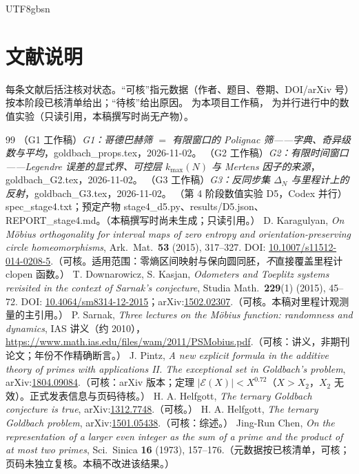 \documentclass[11pt,a4paper]{article}
\newcommand{\Exc}{\mathcal E}          %
\theoremstyle{plain}
\theoremstyle{definition}
\begin{document}
\begin{CJK}{UTF8}{gbsn}
\section*{文献说明}
每条文献后括注核对状态。“可核”指元数据（作者、题目、卷期、DOI/arXiv 号）按本阶段已核清单给出；“待核”给出原因。
\cite{G1,G2,G3} 为本项目工作稿，\cite{D5} 为并行进行中的数值实验（只读引用，本稿撰写时尚无产物）。

\begin{thebibliography}{99}
 （G1 工作稿）\emph{G1：哥德巴赫筛 $=$ 有限窗口的 Polignac 筛——字典、奇异级数与平均}，goldbach\_props.tex，2026-11-02。
 （G2 工作稿）\emph{G2：有限时间窗口——Legendre 误差的显式界、可控层 $k_{\max}(N)$ 与 Mertens 因子的来源}，goldbach\_G2.tex，2026-11-02。
 （G3 工作稿）\emph{G3：反同步集 $\Delta_N$ 与里程计上的反射}，goldbach\_G3.tex，2026-11-02。
 （第 4 阶段数值实验 D5，Codex 并行）spec\_stage4.txt；预定产物 stage4\_d5.py、results/D5.json、REPORT\_stage4.md。（本稿撰写时尚未生成；只读引用。）
 D. Karagulyan, \emph{On M\"obius orthogonality for interval maps of zero entropy and orientation-preserving circle homeomorphisms},
Ark.\ Mat.\ \textbf{53} (2015), 317--327. DOI: \url{10.1007/s11512-014-0208-5}.（可核。适用范围：零熵区间映射与保向圆同胚，\emph{不}直接覆盖里程计 clopen 函数。）
 T. Downarowicz, S. Kasjan, \emph{Odometers and Toeplitz systems revisited in the context of Sarnak's conjecture},
Studia Math.\ \textbf{229}(1) (2015), 45--72. DOI: \url{10.4064/sm8314-12-2015}；arXiv:\url{1502.02307}.（可核。本稿对里程计观测量的主引用。）
 P. Sarnak, \emph{Three lectures on the M\"obius function: randomness and dynamics}, IAS 讲义（约 2010），
\url{https://www.math.ias.edu/files/wam/2011/PSMobius.pdf}.（可核：讲义，非期刊论文；年份不作精确断言。）
 J. Pintz, \emph{A new explicit formula in the additive theory of primes with applications II. The exceptional set in Goldbach's problem},
arXiv:\url{1804.09084}.（可核：arXiv 版本；定理 $|\Exc(X)|<X^{0.72}$（$X>X_2$，$X_2$ 无效）。正式发表信息与页码待核。）
 H. A. Helfgott, \emph{The ternary Goldbach conjecture is true}, arXiv:\url{1312.7748}.（可核。）
 H. A. Helfgott, \emph{The ternary Goldbach problem}, arXiv:\url{1501.05438}.（可核：综述。）
 Jing-Run Chen, \emph{On the representation of a larger even integer as the sum of a prime and the product of at most two primes},
Sci.\ Sinica \textbf{16} (1973), 157--176.（元数据按已核清单，可核；页码未独立复核。本稿不改进该结果。）

\end{thebibliography}
\end{CJK}
\end{document}
